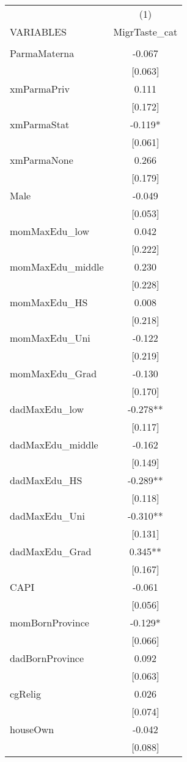 \documentclass[]{article}
\begin{document}
\begin{tabular}{lc} \hline
 & (1) \\
VARIABLES & MigrTaste\_cat \\ \hline
 &  \\
ParmaMaterna & -0.067 \\
 & [0.063] \\
xmParmaPriv & 0.111 \\
 & [0.172] \\
xmParmaStat & -0.119* \\
 & [0.061] \\
xmParmaNone & 0.266 \\
 & [0.179] \\
Male & -0.049 \\
 & [0.053] \\
momMaxEdu\_low & 0.042 \\
 & [0.222] \\
momMaxEdu\_middle & 0.230 \\
 & [0.228] \\
momMaxEdu\_HS & 0.008 \\
 & [0.218] \\
momMaxEdu\_Uni & -0.122 \\
 & [0.219] \\
momMaxEdu\_Grad & -0.130 \\
 & [0.170] \\
dadMaxEdu\_low & -0.278** \\
 & [0.117] \\
dadMaxEdu\_middle & -0.162 \\
 & [0.149] \\
dadMaxEdu\_HS & -0.289** \\
 & [0.118] \\
dadMaxEdu\_Uni & -0.310** \\
 & [0.131] \\
dadMaxEdu\_Grad & 0.345** \\
 & [0.167] \\
CAPI & -0.061 \\
 & [0.056] \\
momBornProvince & -0.129* \\
 & [0.066] \\
dadBornProvince & 0.092 \\
 & [0.063] \\
cgRelig & 0.026 \\
 & [0.074] \\
houseOwn & -0.042 \\
 & [0.088] \\

\end{tabular}
\end{document}
